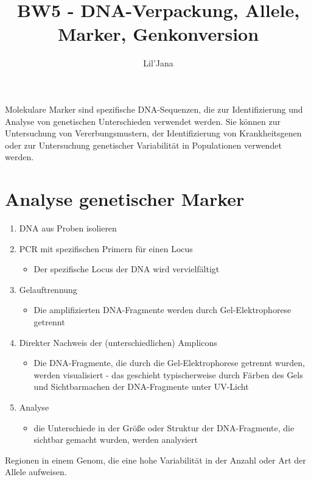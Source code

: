 \documentclass{article}
\title{BW5 - DNA-Verpackung, Allele, Marker, Genkonversion}
\author{Lil'Jana}
\begin{document}
\maketitle
\begin{mybox}[title={Molekulare (genetische) Marker}]
Molekulare Marker sind spezifische DNA-Sequenzen, die zur Identifizierung und Analyse von genetischen Unterschieden verwendet werden. Sie können zur Untersuchung von Vererbungsmustern, der Identifizierung von Krankheitsgenen oder zur Untersuchung genetischer Variabilität in Populationen verwendet werden.
\end{mybox}
\section*{Analyse genetischer Marker}
\begin{enumerate}
    \item DNA aus Proben isolieren
    \item PCR mit spezifischen Primern für einen Locus 
    \begin{itemize}
        \item Der spezifische Locus der DNA wird vervielfältigt
    \end{itemize}
    \item Gelauftrennung
    \begin{itemize}
        \item Die amplifizierten DNA-Fragmente werden durch Gel-Elektrophorese getrennt
    \end{itemize}
    \item Direkter Nachweis der (unterschiedlichen) Amplicons
    \begin{itemize}
        \item Die DNA-Fragmente, die durch die Gel-Elektrophorese getrennt wurden, werden visualisiert - das geschieht typischerweise durch Färben des Gels und Sichtbarmachen der DNA-Fragmente unter UV-Licht
    \end{itemize}
    \item Analyse
    \begin{itemize}
        \item die Unterschiede in der Größe oder Struktur der DNA-Fragmente, die sichtbar gemacht wurden, werden analysiert
    \end{itemize}
\end{enumerate}
\begin{mybox}[title={Loci mit vielen Allelen}]
Regionen in einem Genom, die eine hohe Variabilität in der Anzahl oder Art der Allele aufweisen.
\end{mybox}
\end{document}
